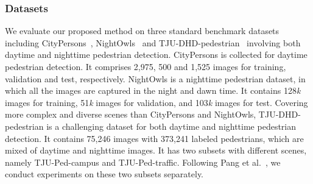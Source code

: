 \documentclass[journal]{IEEEtran}
\begin{document}
\subsubsection{Datasets}
We evaluate our proposed method on three standard benchmark datasets including CityPersons~\cite{zhang2017citypersons}, NightOwls~\cite{neumann2018nightowls} and TJU-DHD-pedestrian~\cite{pang2020tju} involving both daytime and nighttime pedestrian detection. CityPersons is collected for daytime pedestrian detection. It comprises 2,975, 500 and 1,525 images for training, validation and test, respectively.  NightOwls is a nighttime pedestrian dataset, in which all the images are captured in the night and dawn time. It contains 128\emph{k} images for training, 51\emph{k} images for validation, and 103\emph{k} images for test. Covering more complex and diverse scenes than CityPersons and NightOwls, TJU-DHD-pedestrian is a challenging dataset for both daytime and nighttime pedestrian detection. It contains 75,246 images with 373,241 labeled pedestrians, which are mixed of daytime and nighttime images. It has two subsets with different scenes, namely  TJU-Ped-campus and TJU-Ped-traffic. Following Pang et al.~\cite{pang2020tju}, we conduct experiments on these two subsets separately.
\end{document}
